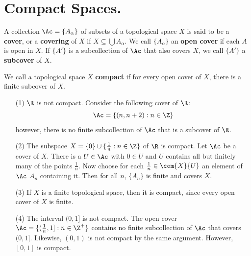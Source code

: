 
\section{Compact Spaces.}

\begin{definition}
    A collection $\Ac=\{A_{\alpha}\}$ of subsets of a topological space $X$ is said to be a  \textbf{cover}, or a
    \textbf{covering} of $X$ if  $X \subseteq \bigcup{A_\alpha}$. We call $\{A_\alpha\}$ an \textbf{open cover} if each $A$
    is open in  $X$. If  $\{A'\}$ is a subcollection of $\Ac$ that also covers $X$, we call
    $\{A'\}$ a \textbf{subcover} of $X$.
\end{definition}

\begin{definition}
    We call a topological space $X$ \textbf{compact} if for every open cover of $X$, there is a
    finite subcover of $X$.
\end{definition}

\begin{example}
    \begin{enumerate}
        \item[(1)] $\R$ is not compact. Consider the following cover of  $\R$:
            \begin{equation*}
                \Ac=\{(n,n+2):n \in \Z\}
            \end{equation*}
            however, there is no finite subcollection of $\Ac$ that is a subcover of  $\R$.

        \item[(2)] The subspace $X=\{0\} \cup \{\frac{1}{n}: n \in \Z\}$ of $\R$ is compact. Let  $\Ac$
            be a cover of  $X$. There is a  $U \in \Ac$ with  $0 \in U$ and $U$ contains all but
            finitely many of the points  $ \frac{1}{n}$. Now choose for each $\frac{1}{n} \in
            \com{X}{U}$ an element of $\Ac$ $A_{n}$ containing it. Then for all $n$,  $\{A_n\}$ is
            finite and covers $X$.

        \item[(3)] If  $X$ is a finite topological space, then it is compact, since every open cover of
            $X$ is finite.

        \item[(4)] The interval  $(0,1]$ is not compact. The open cover $\Ac=\{(\frac{1}{n}, 1]: n \in
            \Z^+\}$ contains no finite subcollection of $\Ac$ that covers  $(0,1]$. Likewise,
            $(0,1)$ is not compact by the same argument. However, $[0,1]$ is compact.
    \end{enumerate}
\end{example}

